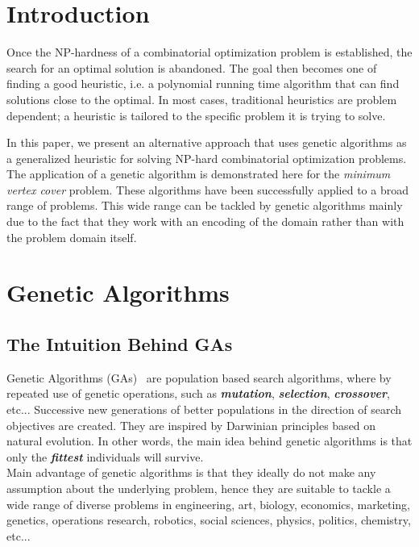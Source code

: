 \documentclass[12pt]{article}
\newcommand{\textem}[1]{\textbf{\textit{#1}}}
\begin{document}
\pagebreak



\section{Introduction}
Once the NP-hardness of a combinatorial optimization
problem is established, the search for an optimal solution
is abandoned. The goal then becomes one of finding a
good heuristic, i.e. a polynomial running time algorithm
that can find solutions close to the optimal. In most cases,
traditional heuristics are problem dependent; a heuristic is
tailored to the specific problem it is trying to solve.

In this paper, we present an alternative approach that
uses genetic algorithms as a generalized heuristic for solving NP-hard combinatorial optimization problems. The
application of a genetic algorithm is demonstrated here for
the \textit{minimum vertex cover} problem. These algorithms
have been successfully applied to a broad range of problems. This wide range can be tackled by genetic algorithms
mainly due to the fact that they work with an encoding of
the domain rather than with the problem domain itself.


\section{Genetic Algorithms}
\subsection{The Intuition Behind GAs}
Genetic Algorithms (GAs)~\cite{goldberg1989genetic} are population based
search algorithms, where by repeated use of genetic operations,
such as \textem{mutation}, \textem{selection}, \textem{crossover}, etc...
Successive new generations of better populations in the direction of
search objectives are created. They are inspired by Darwinian principles
based on natural evolution. In other words, the main idea behind genetic
algorithms is that only the \textem{fittest} individuals will survive.\\
Main advantage of genetic algorithms is that they ideally do not make
any assumption about the underlying problem, hence they are suitable to tackle
a wide range of diverse problems in
engineering, art, biology, economics, marketing, genetics,
operations research, robotics, social sciences, physics, politics, chemistry,
etc...
\end{document}
